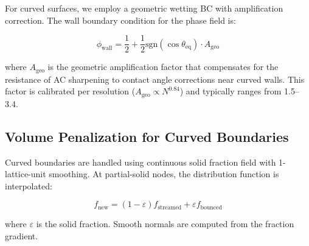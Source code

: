 For curved surfaces, we employ a geometric wetting BC with amplification correction. The wall boundary condition for the phase field is:

\begin{equation}
\phi_{\text{wall}} = \frac{1}{2} + \frac{1}{2}\text{sgn}(\cos\theta_{\text{eq}}) \cdot A_{\text{geo}}
\end{equation}

where $A_{\text{geo}}$ is the geometric amplification factor that compensates for the resistance of AC sharpening to contact angle corrections near curved walls. This factor is calibrated per resolution ($A_{\text{geo}} \propto N^{0.84}$) and typically ranges from 1.5--3.4.

\subsection{Volume Penalization for Curved Boundaries}

Curved boundaries are handled using continuous solid fraction field with 1-lattice-unit smoothing. At partial-solid nodes, the distribution function is interpolated:

\begin{equation}
f_{\text{new}} = (1-\varepsilon) f_{\text{streamed}} + \varepsilon f_{\text{bounced}}
\end{equation}

where $\varepsilon$ is the solid fraction. Smooth normals are computed from the fraction gradient.
